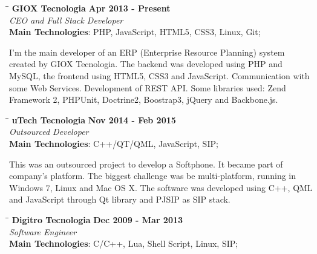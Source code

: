 \documentclass[margin]{res}
\begin{document}
\begin{resume}
\vspace{-0.1in}
   \begin{tabbing}
   \hspace{2.3in}\= \hspace{1.7in}\= \kill %
    \textbf{GIOX Tecnologia}    \>\>\textbf{Apr 2013 - Present}\\
    \textit{CEO and Full Stack Developer}\\        
    \textbf{Main Technologies}: PHP, JavaScript, HTML5, CSS3, Linux, Git;
   \end{tabbing}\vspace{-20pt}      %
    \vspace{2mm}
I'm the main developer of an ERP (Enterprise Resource Planning) system created by GIOX Tecnologia.
The backend was developed using PHP and MySQL, the frontend using HTML5, CSS3 and JavaScript. Communication with some Web 
Services. Development of REST API. Some libraries used: Zend Framework 2, PHPUnit, Doctrine2, Boostrap3, jQuery and Backbone.js.
\vspace{-0.1in}
   \begin{tabbing}
   \hspace{2.3in}\= \hspace{1.7in}\= \kill %
    \textbf{uTech Tecnologia}    \>\>\textbf{Nov 2014 - Feb 2015}\\
    \textit{Outsourced Developer}\\        
    \textbf{Main Technologies}: C++/QT/QML, JavaScript, SIP;
   \end{tabbing}\vspace{-20pt}      %
    \vspace{2mm}
This was an outsourced project to develop a Softphone. It became part of company’s 
platform. The biggest challenge was be multi-platform, running in Windows 7, Linux and Mac OS X.
The software was developed using C++, QML and JavaScript through Qt library and PJSIP as SIP stack.

   \begin{tabbing}
   \hspace{2.3in}\= \hspace{1.7in}\= \kill %
    \textbf{Digitro Tecnologia}    \>\>\textbf{Dec 2009 - Mar 2013}\\
    \textit{Software Engineer}\\   
    \textbf{Main Technologies}: C/C++, Lua, Shell Script, Linux, SIP;
   \end{tabbing}\vspace{-20pt}      %
    \vspace{2mm}


\end{resume}
\end{document}
